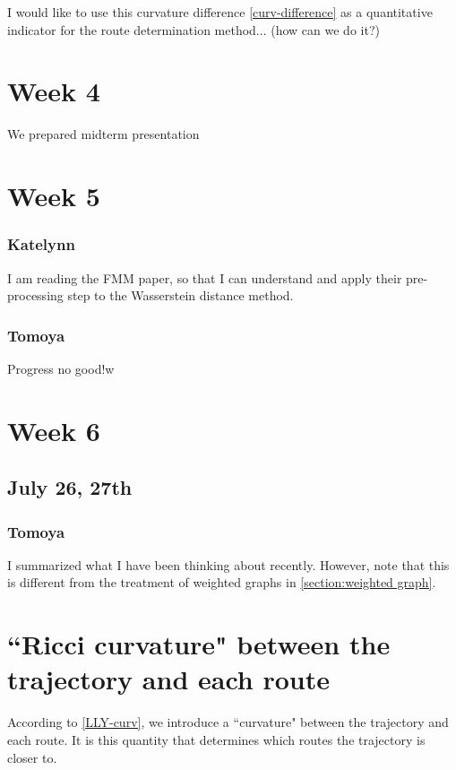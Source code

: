 \documentclass{article}
\numberwithin{equation}{section}
\theoremstyle{definition}
\begin{document}
\bigskip

I would like to use this curvature difference \eqref{curv-difference} as a quantitative indicator for the route determination method$\dots$ (how can we do it?)
\section{Week 4}
We prepared midterm presentation




\section{Week 5}
\subsubsection*{Katelynn}
I am reading the FMM paper, so that I can understand and apply their pre-processing step to the Wasserstein distance method.

\subsubsection*{Tomoya}
Progress no good!w

\section{Week 6}
\subsection{July 26, 27th}
\subsubsection*{Tomoya}
I summarized what I have been thinking about recently.
However, note that this is different from the treatment of weighted graphs in \autoref{section:weighted graph}.

\section*{``Ricci curvature" between the trajectory and each route}

According to \autoref{LLY-curv}, we introduce a ``curvature" between the trajectory and each route.
It is this quantity that determines which routes the trajectory is closer to.
\end{document}
